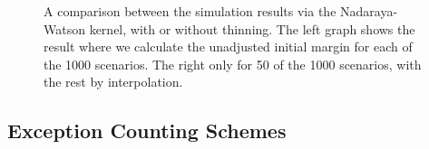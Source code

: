\documentclass[preprint,12pt]{elsarticle}
\begin{document}
\begin{figure}[h] 
\hfill
{}
\hfill
{}
\hfill
\caption{A comparison between the simulation results via the Nadaraya-Watson kernel, with or without thinning. The left graph shows the result where we calculate the unadjusted initial margin for each of the 1000 scenarios. The right only for 50 of the 1000 scenarios, with the rest by interpolation.}
\label{fig:EffectOfThinning}
\end{figure}

\subsection{Exception Counting Schemes}
\end{document}
